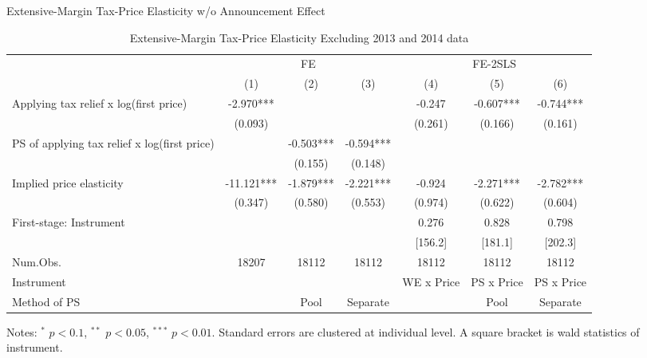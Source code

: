 \documentclass[
  ignorenonframetext,
  aspectratio=169,
]{beamer}
\begin{document}
\begin{frame}{Extensive-Margin Tax-Price Elasticity w/o Announcement Effect}
\protect\hypertarget{extensive-margin-tax-price-elasticity-wo-announcement-effect}{}
\begin{table}

\caption{\label{tab:WoAnnouncementExtensive}Extensive-Margin Tax-Price Elasticity Excluding 2013 and 2014 data}
\centering
\fontsize{7}{9}\selectfont
\begin{threeparttable}
\begin{tabular}[t]{lcccccc}
\toprule
\multicolumn{1}{c}{ } & \multicolumn{3}{c}{FE} & \multicolumn{3}{c}{FE-2SLS} \\
\cmidrule(l{3pt}r{3pt}){2-4} \cmidrule(l{3pt}r{3pt}){5-7}
  & (1) & (2) & (3) & (4) & (5) & (6)\\
\midrule
Applying tax relief x log(first price) & -2.970*** &  &  & -0.247 & -0.607*** & -0.744***\\
 & (0.093) &  &  & (0.261) & (0.166) & (0.161)\\
PS of applying tax relief x log(first price) &  & -0.503*** & -0.594*** &  &  & \\
 &  & (0.155) & (0.148) &  &  & \\
\midrule
Implied price elasticity & -11.121*** & -1.879*** & -2.221*** & -0.924 & -2.271*** & -2.782***\\
 & (0.347) & (0.580) & (0.553) & (0.974) & (0.622) & (0.604)\\
First-stage: Instrument &  &  &  & 0.276 & 0.828 & 0.798\\
 &  &  &  & [156.2] & [181.1] & [202.3]\\
Num.Obs. & 18207 & 18112 & 18112 & 18112 & 18112 & 18112\\
Instrument &  &  &  & WE x Price & PS x Price & PS x Price\\
Method of PS &  & Pool & Separate &  & Pool & Separate\\
\bottomrule
\end{tabular}
\begin{tablenotes}
\item Notes: $^{*}$ $p < 0.1$, $^{**}$ $p < 0.05$, $^{***}$ $p < 0.01$. Standard errors are clustered at individual level. A square bracket is wald statistics of instrument.
\end{tablenotes}
\end{threeparttable}
\end{table}
\end{frame}
\end{document}
